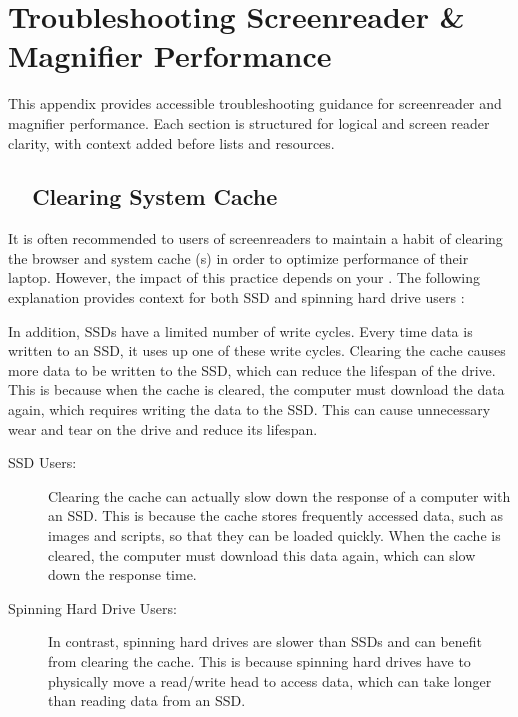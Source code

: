 \chapter{Troubleshooting Screenreader \& Magnifier Performance}
\label{app1:troubleshooting}

\begin{raggedright}
	This appendix provides accessible troubleshooting guidance for screenreader and magnifier performance. Each section is structured for logical  and screen reader clarity, with context added before lists and resources.
\end{raggedright}

\section{~~Clearing System Cache}
\label{app1:cache}
It is often recommended to users of screenreaders to maintain a habit of clearing the browser and system cache (s) in order to optimize performance of their laptop. However, the impact of this practice depends on your . The following explanation provides context for both SSD and spinning hard drive users \cite{SystemOptimizationGuides, Microsoft2023WindowsPerformance}:

In addition, SSDs have a limited number of write cycles. Every time data is written to an SSD, it uses up one of these write cycles. Clearing the cache causes more data to be written to the SSD, which can reduce the lifespan of the drive. This is because when the cache is cleared, the computer must download the data again, which requires writing the data to the SSD. This can cause unnecessary wear and tear on the drive and reduce its lifespan.

\begin{description}
	\item[SSD Users:] Clearing the cache can actually slow down the response of a computer with an SSD. This is because the cache stores frequently accessed data, such as images and scripts, so that they can be loaded quickly. When the cache is cleared, the computer must download this data again, which can slow down the response time.
	\item[Spinning Hard Drive Users:] In contrast, spinning hard drives are slower than SSDs and can benefit from clearing the cache. This is because spinning hard drives have to physically move a read/write head to access data, which can take longer than reading data from an SSD.
\end{description}

